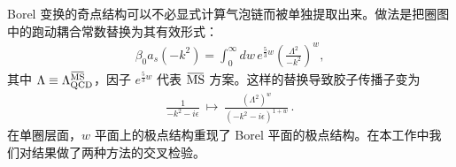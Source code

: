 Borel 变换的奇点结构可以不必显式计算气泡链而被单独提取出来。做法是把圈图中的跑动耦合常数替换为其有效形式：
\begin{align}
  \beta_0 a_s(-k^2) =  \int_0^\infty \!dw\, e^{\frac53 w} \left(\frac{\Lambda^2}{-k^2}\right)^w ,
\end{align}
其中 $\Lambda \equiv \Lambda_{\rm QCD}^{\MSbar}$，因子 $e^{\frac53 w}$ 代表 $\MSbar$ 方案。这样的替换导致胶子传播子变为
\begin{align}\label{modgluonprop}
  \frac{1}{-k^2-i\epsilon} ~\mapsto~ \frac{(\Lambda^2)^w}{(-k^2-i\epsilon)^{1+w}}\,.
\end{align}
在单圈层面，$w$ 平面上的极点结构重现了 Borel 平面的极点结构。在本工作中我们对结果做了两种方法的交叉检验。


%

